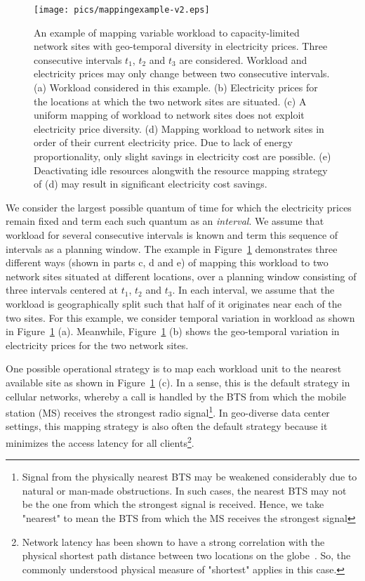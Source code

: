 \begin{figure}
\centering
\texttt{[image: pics/mappingexample-v2.eps]}
\caption{An example of mapping variable workload to capacity-limited network sites with geo-temporal diversity in electricity prices. Three consecutive intervals $t_1$, $t_2$ and $t_3$ are considered. Workload and electricity prices may only change between two consecutive intervals. (a) Workload considered in this example. (b) Electricity prices for the locations at which the two network sites are situated. (c) A uniform mapping of workload to network sites does not exploit electricity price diversity. (d) Mapping workload to network sites in order of their current electricity price. Due to lack of energy proportionality, only slight savings in electricity cost are possible. (e) Deactivating idle resources alongwith the resource mapping strategy of (d) may result in significant electricity cost savings.}
\label{fig:mappingexample}
\end{figure}

We consider the largest possible quantum of time for which the electricity prices remain fixed and term each such quantum as an \textit{interval}. We assume that workload for several consecutive intervals is known and term this sequence of intervals as a planning window. The example in Figure~\ref{fig:mappingexample} demonstrates three different ways (shown in parts c, d and e) of mapping this workload to two network sites situated at different locations, over a planning window consisting of three intervals centered at $t_1$, $t_2$ and $t_3$. In each interval, we assume that the workload is geographically split such that half of it originates near each of the two sites. For this example, we consider temporal variation in workload as shown in Figure~\ref{fig:mappingexample} (a). Meanwhile, Figure~\ref{fig:mappingexample} (b) shows the geo-temporal variation in electricity prices for the two network sites.

One possible operational strategy is to map each workload unit to the nearest available site as shown in Figure~\ref{fig:mappingexample} (c). In a sense, this is the default strategy in cellular networks, whereby a call is handled by the BTS from which the mobile station (MS) receives the strongest radio signal\footnote{Signal from the physically nearest BTS may be weakened considerably due to natural or man-made obstructions. In such cases, the nearest BTS may not be the one from which the strongest signal is received. Hence, we take "nearest" to mean the BTS from which the MS receives the strongest signal}. In geo-diverse data center settings, this mapping strategy is also often the default strategy because it minimizes the access latency for all clients\footnote{Network latency has been shown to have a strong correlation with the physical shortest path distance between two locations on the globe~\cite{dina:p2pdelay:infocom:2004}. So, the commonly understood physical measure of "shortest" applies in this case.}. 

